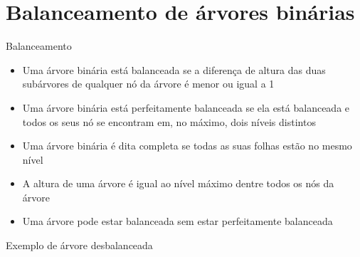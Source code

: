 \section{Balanceamento de árvores binárias}

\begin{frame}[fragile]{Balanceamento}

	\begin{itemize}
		\item Uma árvore binária está balanceada se a diferença de altura das duas subárvores de 
            qualquer nó da árvore é menor ou igual a 1

        \item Uma árvore binária está perfeitamente balanceada se ela está balanceada e todos os 
            seus nó se encontram em, no máximo, dois níveis distintos

        \item Uma árvore binária é dita completa se todas as suas folhas estão no mesmo nível

        \item A altura de uma árvore é igual ao nível máximo dentre todos os nós da árvore

        \item Uma árvore pode estar balanceada sem estar perfeitamente balanceada
	\end{itemize}

\end{frame} 
 

\begin{frame}[fragile]{Exemplo de árvore desbalanceada}


\end{frame}

